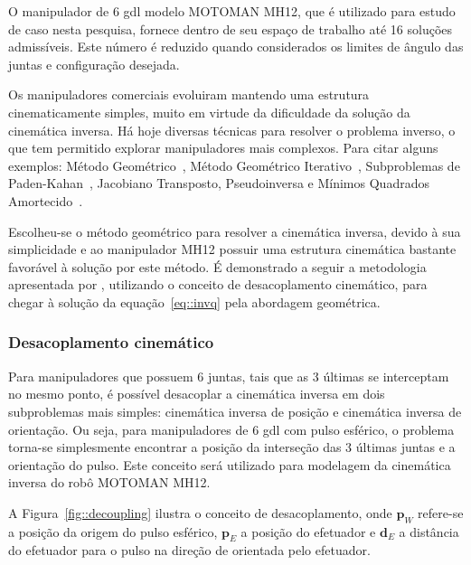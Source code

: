 O manipulador de 6 gdl modelo MOTOMAN MH12, que é utilizado para estudo de caso
nesta pesquisa, fornece dentro de seu espaço de trabalho até 16 soluções
admissíveis.
Este número é reduzido quando considerados os limites de ângulo das juntas e
configuração desejada.

Os manipuladores comerciais evoluiram mantendo uma estrutura cinematicamente
simples, muito em virtude da dificuldade da solução da cinemática inversa.
Há hoje diversas técnicas para resolver o problema inverso, o que tem permitido
explorar manipuladores mais complexos. Para citar alguns exemplos:
Método Geométrico~\cite{spong2006robot}, Método Geométrico
Iterativo~\cite{pinto1989solucao}, Subproblemas de
Paden-Kahan~\cite{murray1994mathematical}, Jacobiano Transposto, Pseudoinversa e
Mínimos Quadrados Amortecido~\cite{buss2004introduction}.

Escolheu-se o método geométrico para resolver a cinemática inversa, devido à sua
simplicidade e ao manipulador MH12 possuir uma estrutura cinemática bastante
favorável à solução por este método. É demonstrado a seguir a metodologia
apresentada por \citet{spong2006robot}, utilizando o conceito de desacoplamento
cinemático, para chegar à solução da equação~\ref{eq::invq} pela abordagem
geométrica.


\subsubsection{Desacoplamento cinemático}

Para manipuladores que possuem 6 juntas, tais que as 3 últimas se interceptam no
mesmo ponto, é possível desacoplar a cinemática inversa em dois subproblemas
mais simples: cinemática inversa de posição e cinemática inversa de orientação. Ou
seja, para manipuladores de 6 gdl com pulso esférico, o problema torna-se
simplesmente encontrar a posição da interseção das 3 últimas juntas e a
orientação do pulso. Este conceito será utilizado para modelagem da cinemática
inversa do robô MOTOMAN MH12.

A Figura~\ref{fig::decoupling} ilustra o conceito de desacoplamento, onde
$\mathbf{p}_W$ refere-se a posição da origem do pulso esférico, $\mathbf{p}_E$ a
posição do efetuador e $\mathbf{d}_E$ a distância do efetuador para o pulso na direção
de orientada pelo efetuador.

